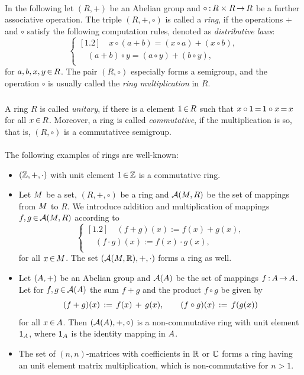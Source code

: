 \documentclass[11pt,twoside]{article}
\begin{document}
\paragraph{}
In the following let $(R,+)$ be an Abelian group
and $\circ {\,:\,} R \times R {\,\to\,} R$ be a further associative operation.
The triple $(R,+,\circ)$ is called a \textit{ring},
if the operations $+$ and $\circ$ satisfy the following computation rules,
denoted as \textit{distributive laws}:
\[
\begin{cases}[1.2]
\quad x \circ (a + b) = (x \circ a) + (x \circ b), \\
\quad (a + b) \circ y = (a \circ y) + (b \circ y), \\
\end{cases}
\]
for $a,b,x,y {\,\in\,} R$.
The pair $(R,\circ)$ especially forms a semigroup,
and the operation $\circ$ is usually called the \textit{ring multiplication} in $R$.

\subparagraph{}
A ring $R$ is called \textit{unitary},
if there is a element ${\mathsf{1}} {\,\in\,} R$
such that $x \circ {\mathsf{1}} {\,=\,} {\mathsf{1}} \circ x {\,=\,} x$ for all $x {\,\in\,} R$.
Moreover,
a ring is called \textit{commutative},
if the multiplication is so,
that is,
$(R,\circ)$ is a commutativee semigroup.

\paragraph{}
The following examples of rings are well-known:

\begin{itemize}[leftmargin=15pt]
\item[1.]
$({\mathbb{Z}},+,\cdot)$ with unit element $1 {\,\in\,} {\mathbb{Z}}$ is a commutative ring.

\item[2.]
Let $M$ be a set, $(R,+,\circ)$ be a ring
and ${\mathcal{A}}(M,R)$ be the set of mappings from $M$ to $R$.
We introduce addition and multiplication of mappings
$f,g {\,\in\,} {\mathcal{A}}(M,R)$ according to
\[
\begin{cases}[1.2]
\quad (f + g)(x) := f(x) + g(x),\\
\quad (f \cdot g)(x) := f(x) \cdot g(x),\\
\end{cases}
\]
for all $x {\,\in\,} M$.
The set $({\mathcal{A}}(M,{\mathbb{R}}), +, \cdot)$ forms a ring as well.

\item[3.]
Let $(A,+)$ be an Abelian group
and ${\mathcal{A}}(A)$ be the set of mappings $f {\,:\,} A {\,\to\,} A$.
Let for $f,g {\,\in\,} {\mathcal{A}}(A)$ the sum $f + g$
and the product $f \circ g$ be given by
\[
(f + g)(x) \,:=\, f(x) \,+\, g(x), \quad \quad (f \circ g)(x) \,:=\, f(g(x))
\]
for all $x {\,\in\,} A$.
Then $({\mathcal{A}}(A),+,\circ)$ is a non-commutative ring with unit element ${\mathsf{1}}_A$,
where ${\mathsf{1}}_A$ is the identity mapping in $A$.

\item[4.]
The set of $(n,n)$-matrices with coefficients in ${\mathbb{R}}$ or ${\mathbb{C}}$ forms a ring
having an unit element {\wrt} matrix multiplication,
which is non-commutative for $n > 1$.
\end{itemize}
\end{document}
